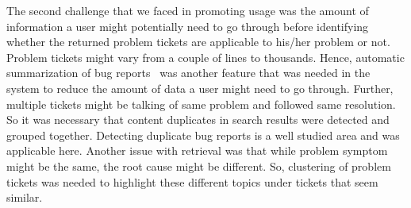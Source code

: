 The second challenge that we faced in promoting usage was the amount of information a user might potentially need to go through before identifying whether the returned problem tickets are applicable to his/her problem or not. Problem tickets might vary from a couple of lines to thousands. Hence, automatic summarization of bug reports~\cite{} was another feature that was needed in the system to reduce the amount of data a user might need to go through. Further, multiple tickets might be talking of same problem and followed same resolution. So it was necessary that content duplicates in search results were detected and grouped together. Detecting duplicate bug reports is a well studied area \cite{} and was applicable here. Another issue with retrieval was that while problem symptom might be the same, the root cause might be different. So, clustering of problem tickets was needed to highlight these different topics under tickets that seem similar. 

